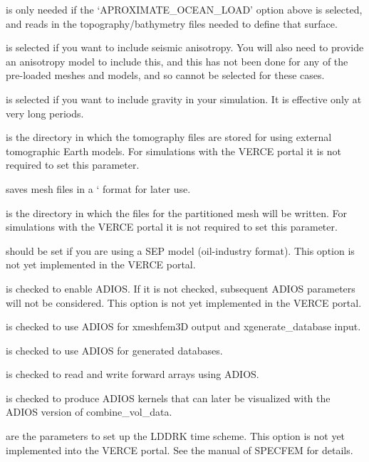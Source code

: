 \documentclass[english]{book}
\begin{document}
 is only needed if the ‘APROXIMATE\_OCEAN\_LOAD’ option
above is selected, and reads in the topography/bathymetry files needed
to define that surface.

 is selected if you want to include seismic anisotropy.
You will also need to provide an anisotropy model to include this, and
this has not been done for any of the pre-loaded meshes and models, and
so cannot be selected for these cases.

 is selected if you want to include gravity in your
simulation. It is effective only at very long periods.

 is the directory in which the tomography files are
stored for using external tomographic Earth models. For simulations with
the VERCE portal it is not required to set this parameter.

 saves mesh files in a ‘ format for
later use.

 is the directory in which the files for the partitioned
mesh will be written. For simulations with the VERCE portal it is not
required to set this parameter.

 should be set if you are using a SEP model
(oil-industry format). This option is not yet implemented in the VERCE
portal.

 is checked to enable ADIOS. If it is not checked,
subsequent ADIOS parameters will not be considered. This option is not
yet implemented in the VERCE portal.

 is checked to use ADIOS for xmeshfem3D output
and xgenerate\_database input.

 is checked to use ADIOS for generated databases.

 is checked to read and write forward
arrays using ADIOS.

 is checked to produce ADIOS kernels that can
later be visualized with the ADIOS version of combine\_vol\_data.

 are the parameters to set up the
LDDRK time scheme. This option is not yet implemented into the VERCE
portal. See the manual of SPECFEM for details.
\end{document}
